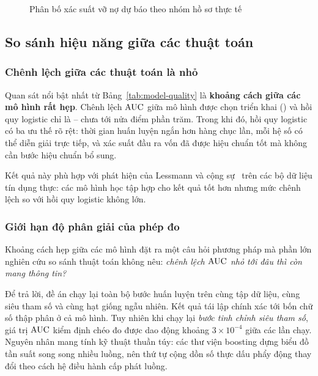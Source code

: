 \begin{figure}[!htbp]
\centering
{}
\caption{Phân bố xác suất vỡ nợ dự báo theo nhóm hồ sơ thực tế}
\label{fig:score-distribution}
\end{figure}

\subsection{So sánh hiệu năng giữa các thuật toán}
\label{subsec:so-sanh-thuat-toan}

\subsubsection{Chênh lệch giữa các thuật toán là nhỏ}

Quan sát nổi bật nhất từ Bảng~\ref{tab:model-quality} là \textbf{khoảng cách giữa
các mô hình rất hẹp}. Chênh lệch $\mathrm{AUC}$ giữa mô hình được chọn triển khai
(\BestModel{}) và hồi quy logistic chỉ là \GapBestLR{} -- chưa tới nửa điểm phần
trăm. Trong khi đó, hồi quy logistic có ba ưu thế rõ rệt: thời gian huấn luyện
ngắn hơn hàng chục lần, mỗi hệ số có thể diễn giải trực tiếp, và xác suất đầu ra
vốn đã được hiệu chuẩn tốt mà không cần bước hiệu chuẩn bổ sung.

Kết quả này phù hợp với phát hiện của Lessmann và cộng sự~\cite{lessmann2015}
trên các bộ dữ liệu tín dụng thực: các mô hình học tập hợp cho kết quả tốt hơn
nhưng mức chênh lệch so với hồi quy logistic không lớn.

\subsubsection{Giới hạn độ phân giải của phép đo}
\label{subsec:do-phan-giai}

Khoảng cách hẹp giữa các mô hình đặt ra một câu hỏi phương pháp mà phần lớn
nghiên cứu so sánh thuật toán không nêu: \textit{chênh lệch $\mathrm{AUC}$ nhỏ tới đâu
thì còn mang thông tin?}

Để trả lời, đề án chạy lại toàn bộ bước huấn luyện trên cùng tập dữ liệu, cùng
siêu tham số và cùng hạt giống ngẫu nhiên. Kết quả tái lập chính xác tới bốn chữ
số thập phân ở cả \NModels{} mô hình. Tuy nhiên khi chạy lại \textit{bước tinh
chỉnh siêu tham số}, giá trị $\mathrm{AUC}$ kiểm định chéo đo được dao động khoảng
$3 \times 10^{-4}$ giữa các lần chạy. Nguyên nhân mang tính kỹ thuật thuần túy:
các thư viện boosting dựng biểu đồ tần suất song song nhiều luồng, nên thứ tự
cộng dồn số thực dấu phẩy động thay đổi theo cách hệ điều hành cấp phát luồng.


